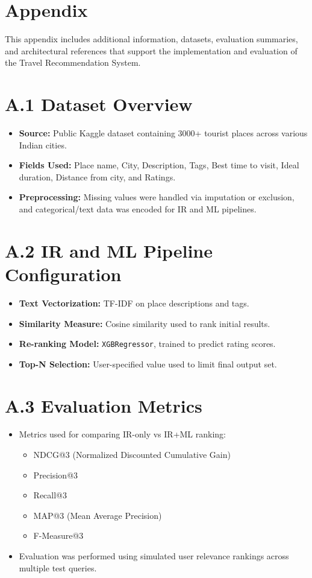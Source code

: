 \documentclass[12pt,a4paper]{article}
\begin{document}
\newpage
\section{Appendix}
This appendix includes additional information, datasets, evaluation summaries, and architectural references that support the implementation and evaluation of the Travel Recommendation System.

\section*{A.1 Dataset Overview}
\begin{itemize}
    \item \textbf{Source:} Public Kaggle dataset containing 3000+ tourist places across various Indian cities.
    \item \textbf{Fields Used:} Place name, City, Description, Tags, Best time to visit, Ideal duration, Distance from city, and Ratings.
    \item \textbf{Preprocessing:} Missing values were handled via imputation or exclusion, and categorical/text data was encoded for IR and ML pipelines.
\end{itemize}

\section*{A.2 IR and ML Pipeline Configuration}
\begin{itemize}
    \item \textbf{Text Vectorization:} TF-IDF on place descriptions and tags.
    \item \textbf{Similarity Measure:} Cosine similarity used to rank initial results.
    \item \textbf{Re-ranking Model:} \texttt{XGBRegressor}, trained to predict rating scores.
    \item \textbf{Top-N Selection:} User-specified value used to limit final output set.
\end{itemize}

\section*{A.3 Evaluation Metrics}
\begin{itemize}
    \item Metrics used for comparing IR-only vs IR+ML ranking:
    \begin{itemize}
        \item NDCG@3 (Normalized Discounted Cumulative Gain)
        \item Precision@3
        \item Recall@3
        \item MAP@3 (Mean Average Precision)
        \item F-Measure@3
    \end{itemize}
    \item Evaluation was performed using simulated user relevance rankings across multiple test queries.
\end{itemize}
\end{document}
